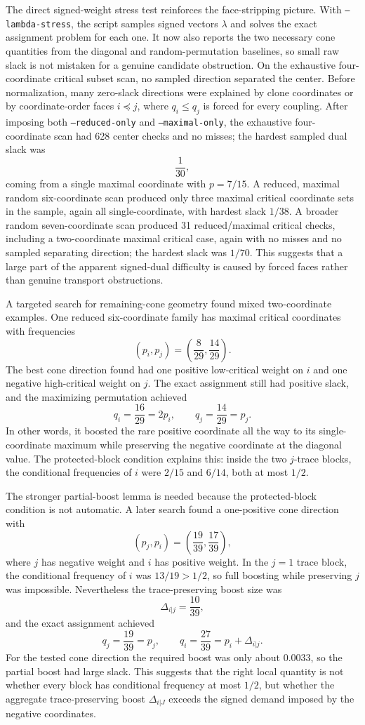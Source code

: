 \documentclass[11pt]{article}
\begin{document}
The direct signed-weight stress test reinforces the face-stripping picture.
With \texttt{--lambda-stress}, the script samples signed vectors $\lambda$ and
solves the exact assignment problem for each one.  It now also reports the two
necessary cone quantities from the diagonal and random-permutation baselines,
so small raw slack is not mistaken for a genuine candidate obstruction.  On
the exhaustive four-coordinate critical subset scan, no sampled direction
separated the center.  Before normalization, many zero-slack directions were
explained by clone coordinates or by coordinate-order faces $i\preceq j$,
where $q_i\leq q_j$ is forced for every coupling.  After imposing both
\texttt{--reduced-only} and \texttt{--maximal-only}, the exhaustive
four-coordinate scan had 628 center checks and no misses; the hardest sampled
dual slack was
\[
  \frac1{30},
\]
coming from a single maximal coordinate with $p=7/15$.  A reduced, maximal
random six-coordinate scan produced only three maximal critical coordinate
sets in the sample, again all single-coordinate, with hardest slack
$1/38$.  A broader random seven-coordinate scan produced 31 reduced/maximal
critical checks, including a two-coordinate maximal critical case, again with
no misses and no sampled separating direction; the hardest slack was $1/70$.
This suggests that a large part of the apparent signed-dual difficulty is
caused by forced faces rather than genuine transport obstructions.

A targeted search for remaining-cone geometry found mixed two-coordinate
examples.  One reduced six-coordinate family has maximal critical coordinates
with frequencies
\[
  (p_i,p_j)=\left(\frac8{29},\frac{14}{29}\right).
\]
The best cone direction found had one positive low-critical weight on $i$ and
one negative high-critical weight on $j$.  The exact assignment still had
positive slack, and the maximizing permutation achieved
\[
  q_i=\frac{16}{29}=2p_i,
  \qquad
  q_j=\frac{14}{29}=p_j.
\]
In other words, it boosted the rare positive coordinate all the way to its
single-coordinate maximum while preserving the negative coordinate at the
diagonal value.  The protected-block condition explains this: inside the two
$j$-trace blocks, the conditional frequencies of $i$ were $2/15$ and $6/14$,
both at most $1/2$.

The stronger partial-boost lemma is needed because the protected-block
condition is not automatic.  A later search found a one-positive cone
direction with
\[
  (p_j,p_i)=\left(\frac{19}{39},\frac{17}{39}\right),
\]
where $j$ has negative weight and $i$ has positive weight.  In the
$j=1$ trace block, the conditional frequency of $i$ was $13/19>1/2$, so full
boosting while preserving $j$ was impossible.  Nevertheless the
trace-preserving boost size was
\[
  \Delta_{i|j}=\frac{10}{39},
\]
and the exact assignment achieved
\[
  q_j=\frac{19}{39}=p_j,
  \qquad
  q_i=\frac{27}{39}=p_i+\Delta_{i|j}.
\]
For the tested cone direction the required boost was only about $0.0033$,
so the partial boost had large slack.  This suggests that the right local
quantity is not whether every block has conditional frequency at most $1/2$,
but whether the aggregate trace-preserving boost $\Delta_{i|J}$ exceeds the
signed demand imposed by the negative coordinates.
\end{document}
